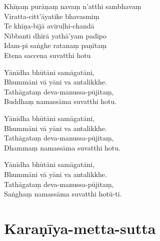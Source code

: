\begin{paritta}
%
Khīṇaṃ purāṇaṃ navaṃ n'atthi sambhavaṃ\\
Viratta-citt'āyatike bhavasmiṃ\\
Te khīṇa-bījā aviruḷhi-chandā\\
Nibbanti dhīrā yathā'yam padīpo\\
Idam-pi saṅghe ratanaṃ paṇītaṃ\\
Etena saccena suvatthi hotu

Yānīdha bhūtāni samāgatāni,\\
Bhummāni vā yāni va antalikkhe.\\
Tathāgataṃ deva-manussa-pūjitaṃ,\\
Buddhaṃ namassāma suvatthi hotu.

Yānīdha bhūtāni samāgatāni,\\
Bhummāni vā yāni va antalikkhe.\\
Tathāgataṃ deva-manussa-pūjitaṃ,\\
Dhammaṃ namassāma suvatthi hotu.

Yānīdha bhūtāni samāgatāni,\\
Bhummāni vā yāni va antalikkhe.\\
Tathāgataṃ deva-manussa-pūjitaṃ,\\
Saṅghaṃ namassāma suvatthi hotū-ti. 

\end{paritta}

\section{Karaṇīya-metta-sutta}

